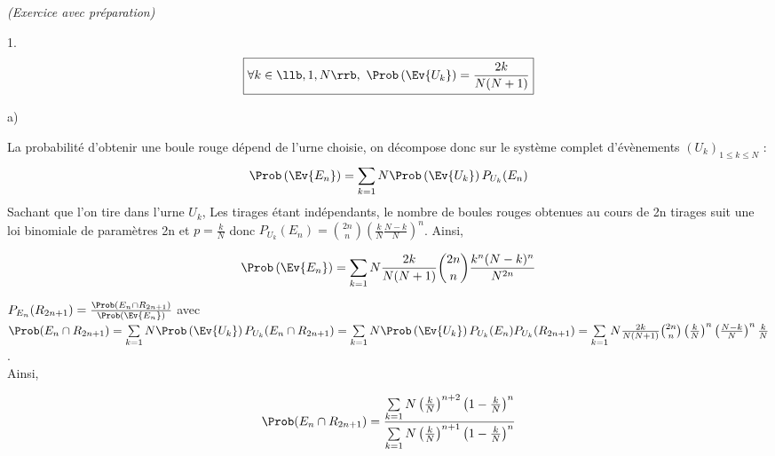 \documentclass[11pt]{article}%
\begin{document}
\begin{exercice}{\it (Exercice avec préparation)}
\begin{noliste}{1.}
\[
 \boxed{\forall k \in \llb, 1,N \rrb, \ \Prob\left(\Ev{U_{k}}\right) =
\frac{2k}{N(N + 1)}}
\]
 \item
 \begin{noliste}{a)}
 \setlength{\itemsep}{2mm}
 \item La probabilité d'obtenir une boule rouge dépend de l'urne
choisie, on décompose donc sur le système complet d'évènements
$(U_{k})_{ 1 \leq k \leq N}$ : \\
 
\[
 \Prob\left(\Ev{E_{n}}\right) = \sum \limits_{k = 1}{N}
\Prob\left(\Ev{U_{k}}\right) P_{U_{k}}(E_{n})
\]
 Sachant que l'on tire dans l'urne $U_{k}$, Les tirages étant
indépendants, le nombre de boules rouges obtenues au cours de 2n
tirages suit une loi binomiale de paramètres 2n et $p = \frac{k}{N}$
donc $P_{U_{k}}(E_{n}) = \binom{2n}{n} \left(\frac{k}{N}
\frac{N-k}{N}\right)^{n}$. Ainsi, 
 
\[
 \Prob\left(\Ev{E_{n}}\right) = \sum \limits_{k = 1}{N} \frac{2k}{N(N +
1)} \binom{2n}{n}
 \frac{k^{n}(N-k)^{n}}{N^{2n}}
\]
 \item $P_{E_{n}}(R_{2n + 1}) = \frac{\Prob(E_{n} \cap R_{2n +
1})}{\Prob\left(\Ev{E_{n}}\right)}$ avec \\
 $\Prob(E_{n} \cap R_{2n + 1}) = \sum \limits_{k = 1}{N}
\Prob\left(\Ev{U_{k}}\right) P_{U_{k}}(E_{n}
 \cap R_{2n + 1}) = \sum \limits_{k = 1}{N}
\Prob\left(\Ev{U_{k}}\right) P_{U_{k}}(E_{n}
 )P_{U_{k}}(R_{2n + 1}) = \sum \limits_{k = 1}{N} \frac{2k}{N(N + 1)}
 \binom{2n}{n} \left(\frac{k}{N} \right)^{n} \left(\frac{N-k}{N}
 \right)^{n}\frac{k}{N}$.\\
 Ainsi, 
 
\[
 \Prob(E_{n} \cap R_{2n + 1}) = \frac{\sum \limits_{k = 1}{N} \left(
 \frac{k}{N}\right)^{n + 2} \left(1-\frac{k}{N} \right)^{n}
 }{\sum \limits_{k = 1}{N} \left( \frac{k}{N}\right)^{n + 1}
 \left(1-\frac{k}{N} \right)^{n}}
\]
 

\end{noliste}
\end{noliste}
\end{exercice}
\end{document}
